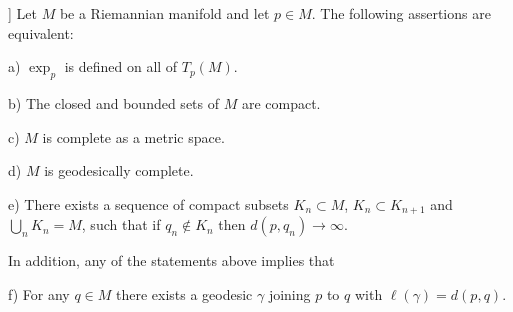 \begin{theorem}[Hopf and Rinow [HR]]
  \label{thm:dc-ch7-2-8}
  Let $M$ be a Riemannian manifold and let $p\in M$. The following assertions are
  equivalent:
  
  a) $\exp_p$ is defined on all of $T_p(M)$.
  
  b) The closed and bounded sets of $M$ are compact.
  
  c) $M$ is complete as a metric space.
  
  d) $M$ is geodesically complete.
  
  e) There exists a sequence of compact subsets $K_n\subset M$, $K_n\subset K_{n+1}$
     and $\bigcup_n K_n=M$, such that if $q_n\notin K_n$ then $d(p,q_n)\to\infty$.
  
  In addition, any of the statements above implies that
  
  f) For any $q\in M$ there exists a geodesic $\gamma$ joining $p$ to $q$ with
     $\ell(\gamma)=d(p,q)$.
\end{theorem}
